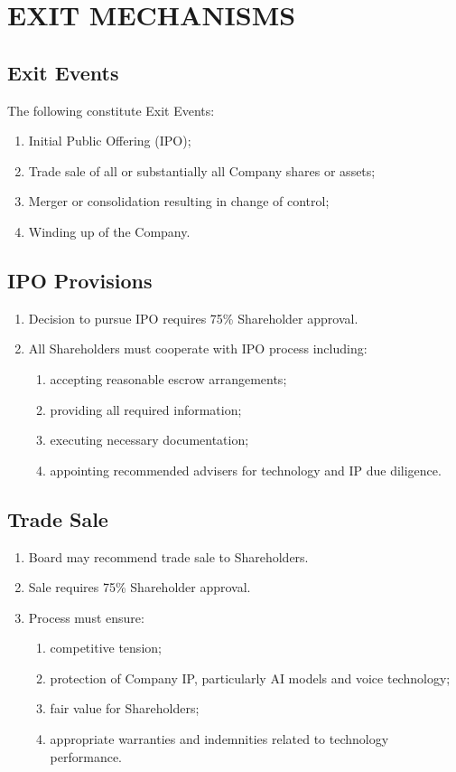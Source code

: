 \section{EXIT MECHANISMS}

\subsection{Exit Events} \label{subsec:ExitEvents}
The following constitute Exit Events:
\begin{enumerate}[label=(\alph*)]
\item Initial Public Offering (IPO);
\item Trade sale of all or substantially all Company shares or assets;
\item Merger or consolidation resulting in change of control;
\item Winding up of the Company.
\end{enumerate}

\subsection{IPO Provisions}
\begin{enumerate}[label=(\alph*)]
\item Decision to pursue IPO requires 75\% Shareholder approval.
\item All Shareholders must cooperate with IPO process including:
    \begin{enumerate}[label=(\roman*)]
    \item accepting reasonable escrow arrangements;
    \item providing all required information;
    \item executing necessary documentation;
    \item appointing recommended advisers for technology and IP due diligence.
    \end{enumerate}
\end{enumerate}

\subsection{Trade Sale}
\begin{enumerate}[label=(\alph*)]
\item Board may recommend trade sale to Shareholders.
\item Sale requires 75\% Shareholder approval.
\item Process must ensure:
    \begin{enumerate}[label=(\roman*)]
    \item competitive tension;
    \item protection of Company IP, particularly AI models and voice technology;
    \item fair value for Shareholders;
    \item appropriate warranties and indemnities related to technology performance.
    \end{enumerate}
\end{enumerate}

